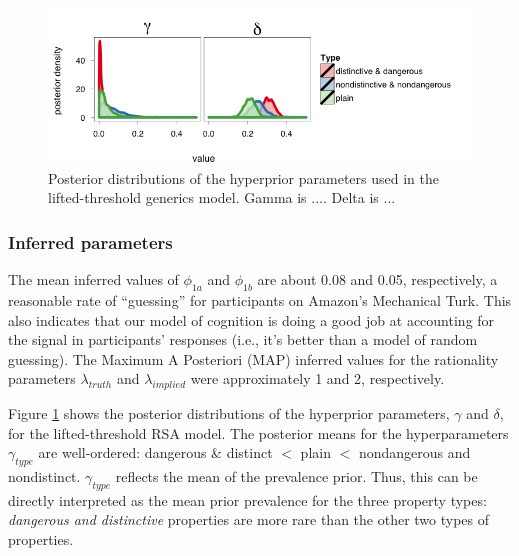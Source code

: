 \documentclass[10pt,letterpaper]{article}
\begin{document}


\begin{figure}
\centering
    \includegraphics[width=\columnwidth]{lvRSA_hyperparams_sidebyside}
  \caption{Posterior distributions of the hyperprior parameters used in the lifted-threshold generics model. Gamma is .... Delta is ...}
   \label{fig:posthyper}
\end{figure}

\subsubsection{Inferred parameters}
The mean inferred values of  $\phi_{1a}$ and $\phi_{1b}$ are about 0.08 and 0.05, respectively, a reasonable rate of ``guessing'' for participants on Amazon's Mechanical Turk. This also  indicates that our model of cognition is doing a good job at accounting for the signal in participants' responses (i.e., it's better than a model of random guessing). The Maximum A Posteriori (MAP) inferred values for the rationality parameters $\lambda_{truth}$ and $\lambda_{implied}$ were approximately 1 and 2, respectively. 


Figure \ref{fig:posthyper} shows the posterior distributions of the hyperprior parameters, $\gamma$ and $\delta$, for the lifted-threshold RSA model. The posterior means for the hyperparameters $\gamma_{type}$ are well-ordered: dangerous \& distinct $<$ plain $<$ nondangerous and nondistinct. $\gamma_{type}$ reflects the mean of the prevalence prior. Thus, this can be directly interpreted as the mean prior prevalence for the three property types: \emph{dangerous and distinctive} properties are more rare than the other two types of properties. 
\end{document}
